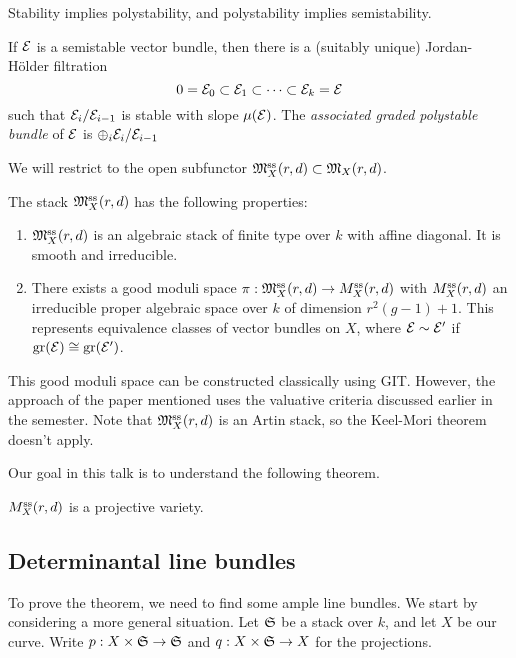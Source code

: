 \documentclass{amsart}
\begin{document}
Stability implies polystability, and polystability implies semistability.

\begin{prop}
	If $\mathcal{E}$ is a semistable vector bundle, then there is a (suitably unique) Jordan-H\"older filtration
	\[
		0 = \mathcal{E}_0 \subset \mathcal{E}_1 \subset \dots \subset \mathcal{E}_k = \mathcal{E}
	\]
	such that $\mathcal{E}_i / \mathcal{E}_{i-1}$ is stable with slope $\mu(\mathcal{E})$.
	The \emph{associated graded polystable bundle} of $\mathcal{E}$ is $\oplus_i \mathcal{E}_i / \mathcal{E}_{i-1}$
\end{prop}

We will restrict to the open subfunctor $\mathfrak{M}_X^{\mathrm{ss}}(r, d) \subset \mathfrak{M}_X(r, d)$.

\begin{thm}
	The stack $\mathfrak{M}_X^{\mathrm{ss}}(r, d)$ has the following properties:
	\begin{enumerate}
		\item $\mathfrak{M}_X^{\mathrm{ss}}(r, d)$ is an algebraic stack of finite type over $k$ with affine diagonal.
			It is smooth and irreducible.
		\item There exists a good moduli space $\pi: \mathfrak{M}_X^{\mathrm{ss}}(r, d) \to M_X^{\mathrm{ss}}(r, d)$ with $M_X^{\mathrm{ss}}(r, d)$ an irreducible proper algebraic space over $k$ of dimension $r^2 (g - 1) + 1$.
			This represents equivalence classes of vector bundles on $X$, where $\mathcal{E} \sim \mathcal{E}'$ if $\operatorname{gr}(\mathcal{E}) \cong \operatorname{gr}(\mathcal{E}')$.
	\end{enumerate}
\end{thm}

\begin{rmk}
	This good moduli space can be constructed classically using GIT.
	However, the approach of the paper mentioned uses the valuative criteria discussed earlier in the semester.
	Note that $\mathfrak{M}_X^{\mathrm{ss}}(r, d)$ is an Artin stack, so the Keel-Mori theorem doesn't apply.
\end{rmk}

Our goal in this talk is to understand the following theorem.

\begin{thm}
	$M_X^{\mathrm{ss}}(r, d)$ is a projective variety.
\end{thm}

\subsection{Determinantal line bundles}

To prove the theorem, we need to find some ample line bundles.
We start by considering a more general situation.
Let $\mathfrak{S}$ be a stack over $k$, and let $X$ be our curve.
Write $p: X \times \mathfrak{S} \to \mathfrak{S}$ and $q: X \times \mathfrak{S} \to X$ for the projections.
\end{document}
